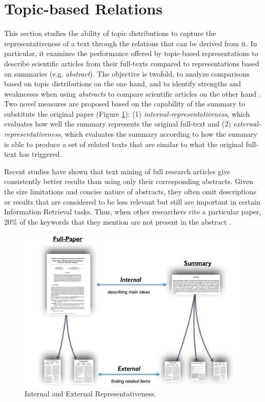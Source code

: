 \section{Topic-based Relations}
\label{sec:topic-relations}

This section studies the ability of topic distributions to capture the representativeness of a text through the relations that can be derived from it. In particular, it examines the performance offered by topic-based representations to describe scientific articles from their full-texts compared to representations based on summaries (e.g. \textit{abstract}). The objective is twofold, to analyze comparisons based on topic distributions on the one hand, and to identify strengths and weaknesses when using \textit{abstracts} to compare scientific articles on the other hand . Two novel measures are proposed based on the capability of the summary to substitute the original paper (Figure \ref{fig:representativeness}): (1) \textit{internal-representativeness}, which evaluates how well the summary represents the original full-text and (2) \textit{external-representativeness}, which evaluates the summary according to how the summary is able to produce a  set of related texts that are similar to what the original full-text has triggered.

Recent studies \citep{Westergaard2017, Sciences2016} have shown that text mining of full research articles give consistently better results than using only their corresponding abstracts. Given the size limitations and concise nature of abstracts, they often omit descriptions or results that are considered to be less relevant but still are important in certain Information Retrieval tasks. Thus, when other researchers cite a particular paper, 20\% of the keywords that they mention are not present in the abstract \citep{Divoli2012}.

\begin{figure}[!htbp]
\centering
\includegraphics[scale=0.24]{internal-external.png}
\caption{Internal and External Representativeness. }
\label{fig:representativeness}
\end{figure}


